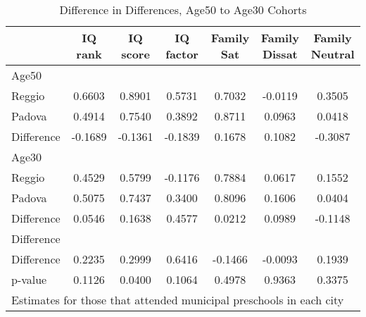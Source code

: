 \begin{table}[htbp]\centering
\caption{Difference in Differences, Age50 to Age30 Cohorts}
\begin{tabular}{l*{6}{c}}
\hline\hline
            &     IQ rank&    IQ score&   IQ factor&  Family Sat&Family Dissat&Family Neutral\\
\hline
Age50       &            &            &            &            &            &            \\
Reggio      &      0.6603&      0.8901&      0.5731&      0.7032&     -0.0119&      0.3505\\
Padova      &      0.4914&      0.7540&      0.3892&      0.8711&      0.0963&      0.0418\\
Difference  &     -0.1689&     -0.1361&     -0.1839&      0.1678&      0.1082&     -0.3087\\
\hline
Age30       &            &            &            &            &            &            \\
Reggio      &      0.4529&      0.5799&     -0.1176&      0.7884&      0.0617&      0.1552\\
Padova      &      0.5075&      0.7437&      0.3400&      0.8096&      0.1606&      0.0404\\
Difference  &      0.0546&      0.1638&      0.4577&      0.0212&      0.0989&     -0.1148\\
\hline
Difference  &            &            &            &            &            &            \\
Difference  &      0.2235&      0.2999&      0.6416&     -0.1466&     -0.0093&      0.1939\\
p-value     &      0.1126&      0.0400&      0.1064&      0.4978&      0.9363&      0.3375\\
\hline\hline
\multicolumn{7}{l}{\footnotesize Estimates for those that attended municipal preschools in each city}\\
\end{tabular}
\end{table}
